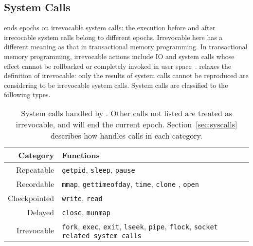 
\subsection{System Calls}
\label{sec:syscall}

\doubletake{} ends epochs on irrevocable system calls: the execution before
and after irrecocable system calls belong to different epochs.
Irrevocable here has a different meaning as that in transactional memory programming. 
In transactional memory programming, irrevocable actions include IO and system calls whose
effect cannot be rollbacked or completely invoked in user space~\cite{Irrevocabletrans}.
\doubletake{} relaxes the definition of irrevocable: only the results of system calls cannot be 
reproduced are considering to be irrevocable system calls. 
System calls are classified to the following types.

\begin{table}[t]
	\centering
	\small
	\renewcommand{\arraystretch}{1.5}
	\begin{tabular}{r|p{6cm}}
		\textbf{Category} & \textbf{Functions} \\
		\hline
		
		Repeatable		& \texttt{getpid}, \texttt{sleep}, \texttt{pause}\\
		
		Recordable		& \texttt{mmap}, \texttt{gettimeofday}, \texttt{time}, 
						  \texttt{clone} , \texttt{open}\\
		
		Checkpointed		& \texttt{write}, \texttt{read} \\
		
		Delayed			& \texttt{close}, \texttt{munmap} \\
		
		Irrevocable		& \texttt{fork}, \texttt{exec}, \texttt{exit}, \texttt{lseek}, \texttt{pipe}, \texttt{flock}, \texttt{socket related system calls}\\
	\end{tabular}
	\caption{
		System calls handled by \doubletake{}. Other calls not listed are treated as irrevocable, and will end the current epoch. Section~\ref{sec:syscalls} describes how \doubletake{} handles calls in each category.
		\label{tbl:syscalls}
	}
\end{table}

